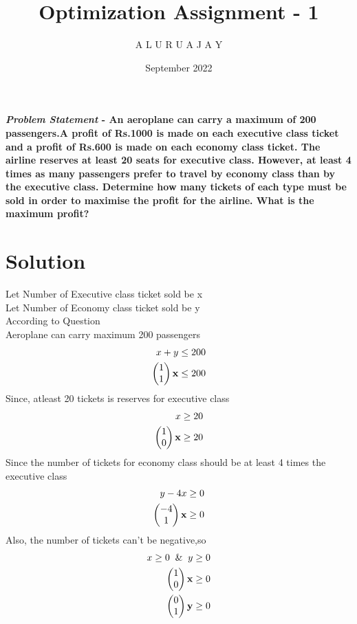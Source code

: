 \documentclass[10pt,twocolumn]{article}
\title{\textbf{Optimization Assignment - 1}}
\author{A L U R U A J A Y}
\date{September 2022}
\let\vec\mathbf
\newcommand{\myvec}[1]{\ensuremath{\begin{pmatrix}#1\end{pmatrix}}}
\begin{document}
\maketitle
\paragraph{\textit{Problem Statement} - An aeroplane can carry a maximum of 200 passengers.A profit of Rs.1000 is made on each executive class ticket and a profit of Rs.600 is made on each economy class ticket. The airline reserves at least 20 seats for executive class. However, at least 4 times as many passengers prefer to travel by economy class than by the executive class. Determine how many tickets of each type must be sold in order to maximise the profit for the airline. What is the maximum profit?} 
\section{Solution}
Let Number of Executive class ticket sold be x
\vspace{0.3cm}\\
Let Number of Economy class ticket sold be y
\vspace{0.3cm}\\
According to Question
\vspace{0.3cm}\\
Aeroplane can carry maximum 200 passengers
\begin{align}
    x+y \leq 200
    \vspace{0.3cm}\\
    \myvec{1\\1}\vec{x}\leq 200
\end{align}
Since, atleast 20 tickets is reserves for executive class
\begin{align}
  x \ge 20  
  \vspace{0.3cm}\\
\myvec{1\\0}\vec{x}\ge 20
\end{align}
Since the number of tickets for economy class should be at least 4 times the executive class
\begin{align}
    y - 4x \ge 0
    \vspace{0.3cm}\\
     \myvec{-4\\1}\vec{x}\ge 0
\end{align}
Also, the number of tickets can't be negative,so
\begin{align}
    x \ge 0 \And y\ge 0
    \vspace{0.3cm}\\
    \myvec{1 \\ 0} \vec{x} \ge 0
      \vspace{0.4cm}\\
    \myvec{0 \\ 1} \vec{y} \ge 0
\end{align}
\end{document}
